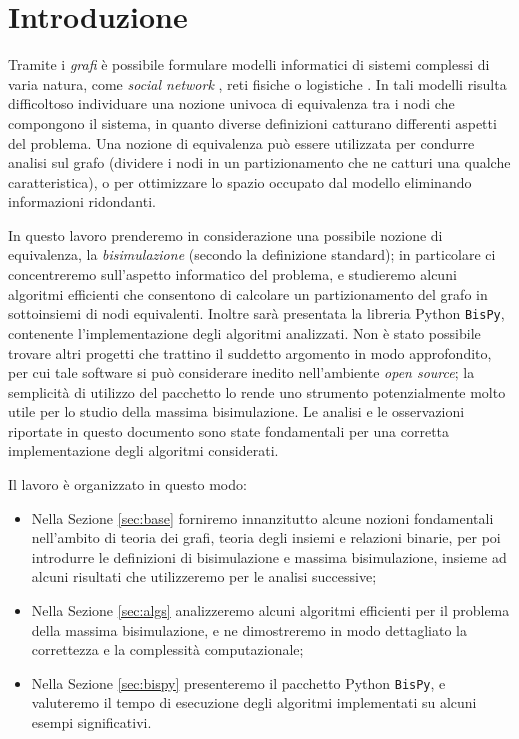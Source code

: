 \section*{Introduzione}

Tramite i \emph{grafi} è possibile formulare modelli informatici di sistemi complessi di varia natura, come \emph{social network} \cite{twitter}, reti fisiche \cite{electric} o logistiche \cite{supply}. In tali modelli risulta difficoltoso individuare una nozione univoca di equivalenza tra i nodi che compongono il sistema, in quanto diverse definizioni catturano differenti aspetti del problema. Una nozione di equivalenza può essere utilizzata per condurre analisi sul grafo (dividere i nodi in un partizionamento che ne catturi una qualche caratteristica), o per ottimizzare lo spazio occupato dal modello eliminando informazioni ridondanti.

In questo lavoro prenderemo in considerazione una possibile nozione di equivalenza, la \emph{bisimulazione} (secondo la definizione standard); in particolare ci concentreremo sull'aspetto informatico del problema, e studieremo alcuni algoritmi efficienti che consentono di calcolare un partizionamento del grafo in sottoinsiemi di nodi equivalenti. Inoltre sarà presentata la libreria Python \texttt{BisPy}, contenente l'implementazione degli algoritmi analizzati. Non è stato possibile trovare altri progetti che trattino il suddetto argomento in modo approfondito, per cui tale software si può considerare inedito nell'ambiente \emph{open source}; la semplicità di utilizzo del pacchetto lo rende uno strumento potenzialmente molto utile per lo studio della massima bisimulazione. Le analisi e le osservazioni riportate in questo documento sono state fondamentali per una corretta implementazione degli algoritmi considerati.

Il lavoro è organizzato in questo modo:
\begin{itemize}
    \item Nella Sezione \ref{sec:base} forniremo innanzitutto alcune nozioni fondamentali nell'ambito di teoria dei grafi, teoria degli insiemi e relazioni binarie, per poi introdurre le definizioni di bisimulazione e massima bisimulazione, insieme ad alcuni risultati che utilizzeremo per le analisi successive;
    \item Nella Sezione \ref{sec:algs} analizzeremo alcuni algoritmi efficienti per il problema della massima bisimulazione, e ne dimostreremo in modo dettagliato la correttezza e la complessità computazionale;
    \item Nella Sezione \ref{sec:bispy} presenteremo il pacchetto Python \texttt{BisPy}, e valuteremo il tempo di esecuzione degli algoritmi implementati su alcuni esempi significativi.
\end{itemize}
